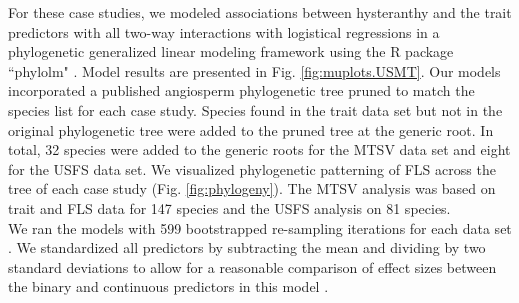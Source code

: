 \documentclass[11pt]{article}
\begin{document}
  \noindent For these case studies, we modeled associations between hysteranthy and the trait predictors with all two-way interactions with logistical regressions in a phylogenetic generalized linear modeling framework \citep{Ives2010} using the R package ``phylolm" \citep{Ho2014}. Model results are presented in Fig. \ref{fig:muplots.USMT}. Our models incorporated a published angiosperm phylogenetic tree \citep{Zanne2013} pruned to match the species list for each case study. Species found in the trait data set but not in the original phylogenetic tree were added to the pruned tree at the generic root. In total, 32 species were added to the generic roots for the MTSV data set and eight for the USFS data set. We visualized phylogenetic patterning of FLS across the tree of each case study (Fig. \ref{fig:phylogeny}). The MTSV analysis was based on trait and FLS data for 147 species and the USFS analysis on 81 species. \\
  
  \noindent We ran the models with 599 bootstrapped re-sampling iterations for each data set \citep{Wilcox2010}. We standardized all predictors by subtracting the mean and dividing by two standard deviations to allow for a reasonable comparison of effect sizes between the binary and continuous predictors in this model \citep{Gelman2007}. 
  
  
\end{document}
